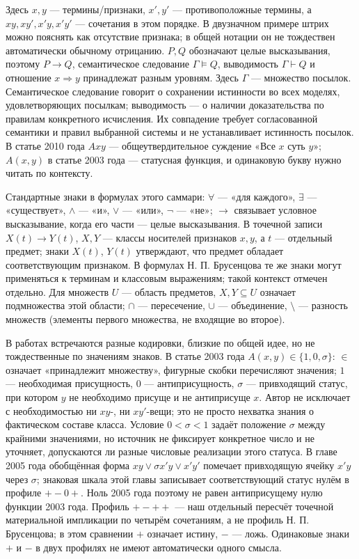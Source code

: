 \documentclass[12pt,a4paper]{article}
\begin{document}
Здесь \(x,y\) — термины/признаки, \(x',y'\) — противоположные термины, а \(xy,xy',x'y,x'y'\) — сочетания в этом порядке. В двузначном примере штрих можно пояснять как отсутствие признака; в общей нотации он не тождествен автоматически обычному отрицанию. \(P,Q\) обозначают целые высказывания, поэтому \(P\to Q\), семантическое следование \(\Gamma\models Q\), выводимость \(\Gamma\vdash Q\) и отношение \(x\Rightarrow y\) принадлежат разным уровням. Здесь \(\Gamma\) — множество посылок. Семантическое следование говорит о сохранении истинности во всех моделях, удовлетворяющих посылкам; выводимость — о наличии доказательства по правилам конкретного исчисления. Их совпадение требует согласованной семантики и правил выбранной системы и не устанавливает истинность посылок. В статье 2010 года \(Axy\) — общеутвердительное суждение «Все \(x\) суть \(y\)»; \(A(x,y)\) в статье 2003 года — статусная функция, и одинаковую букву нужно читать по контексту.

Стандартные знаки в формулах этого саммари: \(\forall\) — «для каждого», \(\exists\) — «существует», \(\land\) — «и», \(\lor\) — «или», \(\neg\) — «не»; \(\to\) связывает условное высказывание, когда его части — целые высказывания. В точечной записи \(X(t)\to Y(t)\), \(X,Y\) — классы носителей признаков \(x,y\), а \(t\) — отдельный предмет; знаки \(X(t)\), \(Y(t)\) утверждают, что предмет обладает соответствующим признаком. В формулах Н. П. Брусенцова те же знаки могут применяться к терминам и классовым выражениям; такой контекст отмечен отдельно. Для множеств \(U\) — область предметов, \(X,Y\subseteq U\) означает подмножества этой области; \(\cap\) — пересечение, \(\cup\) — объединение, \(\setminus\) — разность множеств (элементы первого множества, не входящие во второе).

В работах встречаются разные кодировки, близкие по общей идее, но не тождественные по значениям знаков. В статье 2003 года \(A(x,y)\in\{1,0,\sigma\}\): \(\in\) означает «принадлежит множеству», фигурные скобки перечисляют значения; \(1\) — необходимая присущность, \(0\) — антиприсущность, \(\sigma\) — привходящий статус, при котором \(y\) не необходимо присуще и не антиприсуще \(x\). Автор не исключает с необходимостью ни \(xy\)-, ни \(xy'\)-вещи; это не просто нехватка знания о фактическом составе класса. Условие \(0<\sigma<1\) задаёт положение \(\sigma\) между крайними значениями, но источник не фиксирует конкретное число и не уточняет, допускаются ли разные числовые реализации этого статуса. В главе 2005 года обобщённая форма \(xy\lor\sigma x'y\lor x'y'\) помечает привходящую ячейку \(x'y\) через \(\sigma\); знаковая шкала этой главы записывает соответствующий статус нулём в профиле \(+-0+\). Ноль 2005 года поэтому не равен антиприсущему нулю функции 2003 года. Профиль \(+-++\) — наш отдельный пересчёт точечной материальной импликации по четырём сочетаниям, а не профиль Н. П. Брусенцова; в этом сравнении \(+\) означает истину, \(-\) — ложь. Одинаковые знаки \(+\) и \(-\) в двух профилях не имеют автоматически одного смысла.
\end{document}
